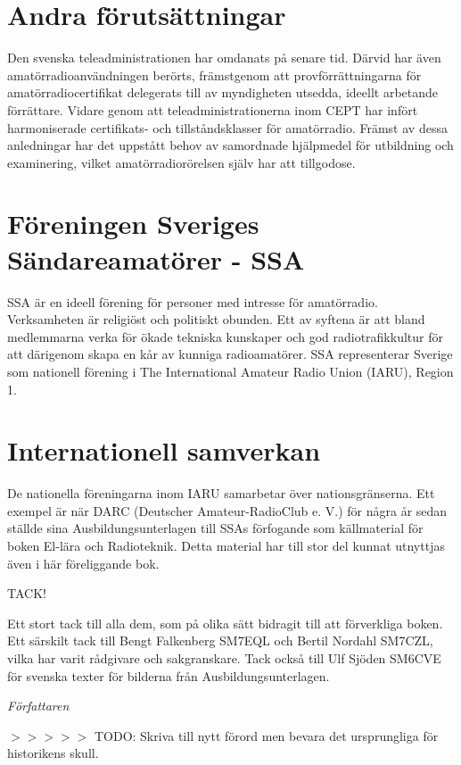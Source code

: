 \begin{rev-ogranskat}

\section*{Andra förutsättningar}

Den svenska teleadministrationen har omdanats på senare tid. Därvid har även
amatörradioanvändningen berörts, främstgenom att provförrättningarna för
amatörradiocertifikat delegerats till av myndigheten utsedda, ideellt arbetande
förrättare. Vidare genom att teleadministrationerna inom CEPT har infört
harmoniserade certifikats- och tillståndsklasser för amatörradio. Främst av
dessa anledningar har det uppstått behov av samordnade hjälpmedel för utbildning
och examinering, vilket amatörradiorörelsen själv har att tillgodose.

\section*{Föreningen Sveriges Sändareamatörer - SSA}

SSA är en ideell förening för personer med intresse för amatörradio.
Verksamheten är religiöst och politiskt obunden. Ett av syftena är att bland
medlemmarna verka för ökade tekniska kunskaper och god radiotrafikkultur för att
därigenom skapa en kår av kunniga radioamatörer. SSA representerar Sverige som
nationell förening i The International Amateur Radio Union (IARU), Region 1.

\section*{Internationell samverkan}

De nationella föreningarna inom IARU samarbetar över nationsgränserna. Ett
exempel är när DARC (Deutscher Amateur-RadioClub e. V.) för några år sedan
ställde sina Ausbildungsunterlagen till SSAs förfogande som källmaterial för
boken El-lära och Radioteknik. Detta material har till stor del kunnat utnyttjas
även i här föreliggande bok.
\end{rev-ogranskat}

\clearpage

\begin{rev-ogranskat}
TACK!

Ett stort tack till alla dem, som på olika sätt bidragit till att förverkliga
boken. Ett särskilt tack till Bengt Falkenberg SM7EQL och Bertil Nordahl SM7CZL,
vilka har varit rådgivare och sakgranskare. Tack också till Ulf Sjöden SM6CVE
för svenska texter för bilderna från Ausbildungsunterlagen.

\emph{Författaren}

$>>>>>$ TODO: Skriva till nytt förord men bevara det ursprungliga för 
historikens skull.

\end{rev-ogranskat}

\twocolumn
